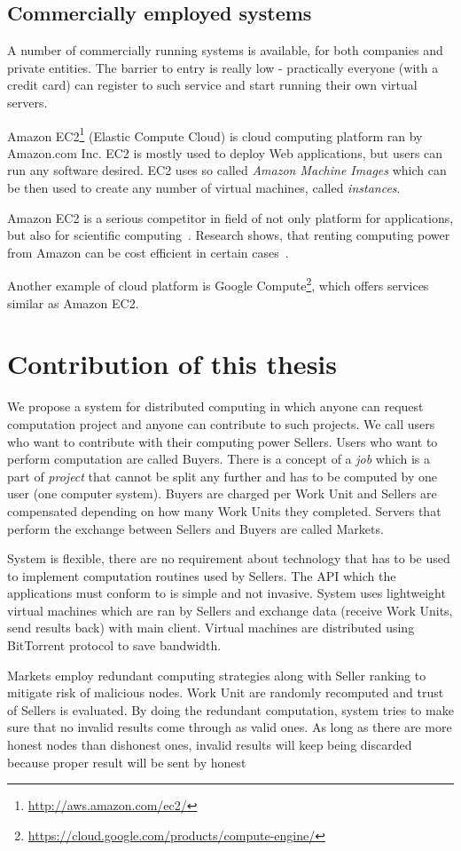 \subsection{Commercially employed systems}
\label{s:comercial_sys}

A number of commercially running systems is available, for both companies and private entities. The barrier to entry is really low - practically everyone (with a credit card) can register to such service and start running their own virtual servers.

Amazon EC2\footnote{\url{http://aws.amazon.com/ec2/}} (Elastic Compute Cloud) is cloud computing platform ran by Amazon.com Inc. EC2 is mostly used to deploy Web applications, but users can run any software desired. EC2 uses so called \emph{Amazon Machine Images} which can be then used to create any number of virtual machines, called \emph{instances}.

Amazon EC2 is a serious competitor in field of not only platform for applications, but also for scientific computing~\cite{walker2008benchmarking}. Research shows, that renting computing power from Amazon can be cost efficient in certain cases~\cite{berriman2013application}.

Another example of cloud platform is Google Compute\footnote{\url{https://cloud.google.com/products/compute-engine/}}, which offers services similar as Amazon EC2.

\section{Contribution of this thesis}

We propose a system for distributed computing in which anyone can request computation project and anyone can contribute to such projects. We call users who want to contribute with their computing power Sellers. Users who want to perform computation are called Buyers. There is a concept of a \emph{job} which is a part of \emph{project} that cannot be split any further and has to be computed by one user (one computer system). Buyers are charged per Work Unit and Sellers are compensated depending on how many Work Units they completed. Servers that perform the exchange between Sellers and Buyers are called Markets.

System is flexible, there are no requirement about technology that has to be used to implement computation routines used by Sellers. The API which the applications must conform to is simple and not invasive. System uses lightweight virtual machines which are ran by Sellers and exchange data (receive Work Units, send results back) with main client. Virtual machines are distributed using BitTorrent protocol to save bandwidth.

Markets employ redundant computing strategies along with Seller ranking to mitigate risk of malicious nodes. Work Unit are randomly recomputed and trust of Sellers is evaluated. By doing the redundant computation, system tries to make sure that no invalid results come through as valid ones. As long as there are more honest nodes than dishonest ones, invalid results will keep being discarded because proper result will be sent by honest
